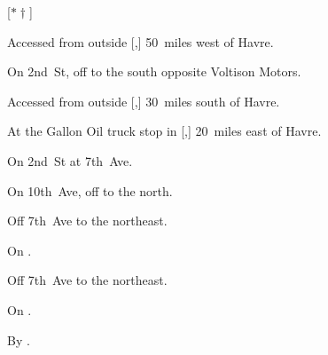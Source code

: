 
[$\ast\dagger$]

\begin{LocationList}

Accessed from  outside [,] 50~miles west of Havre.

On 2nd~St, off  to the south opposite Voltison Motors.

Accessed from  outside [,] 30~miles south of Havre.

At the Gallon Oil truck stop in [,] 20~miles east of Havre.

On 2nd~St at  7th~Ave.

On 10th~Ave, off  to the north.

Off  7th~Ave to the northeast.

\Location{\RecruitmentAgency \Recruitment}
On .

Off  7th~Ave to the northeast.

On .

By .

\end{LocationList}
